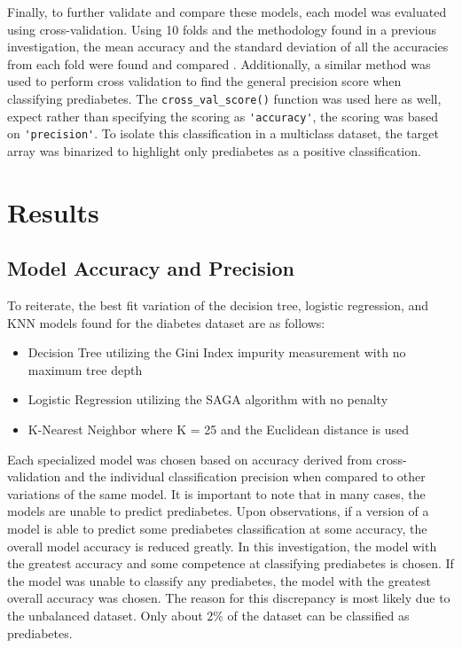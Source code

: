 \documentclass[journal]{IEEEtran}
\begin{document}
Finally, to further validate and compare these models, each model was evaluated using cross-validation. Using 10 folds and the methodology found in a previous investigation, the mean accuracy and the standard deviation of all the accuracies from each fold were found and compared \cite{b12}. Additionally, a similar method was used to perform cross validation to find the general precision score when classifying prediabetes. The \lstinline{cross_val_score()} function was used here as well, expect rather than specifying the scoring as \lstinline{'accuracy'}, the scoring was based on \lstinline{'precision'}. To isolate this classification in a multiclass dataset, the target array was binarized to highlight only prediabetes as a positive classification. 

\section{Results}
\label{sec:results}

\subsection{Model Accuracy and Precision}

To reiterate, the best fit variation of the decision tree, logistic regression, and KNN models found for the diabetes dataset are as follows: 
\begin{itemize}
    \item Decision Tree utilizing the Gini Index impurity measurement with no maximum tree depth
    \item Logistic Regression utilizing the SAGA algorithm with no penalty
    \item K-Nearest Neighbor where K = 25 and the Euclidean distance is used
\end{itemize} 

Each specialized model was chosen based on accuracy derived from cross-validation and the individual classification precision when compared to other variations of the same model. It is important to note that in many cases, the models are unable to predict prediabetes. Upon observations, if a version of a model is able to predict some prediabetes classification at some accuracy, the overall model accuracy is reduced greatly. In this investigation, the model with the greatest accuracy and some competence at classifying prediabetes is chosen. If the model was unable to classify any prediabetes, the model with the greatest overall accuracy was chosen. The reason for this discrepancy is most likely due to the unbalanced dataset. Only about 2\% of the dataset can be classified as prediabetes.
 
\end{document}
